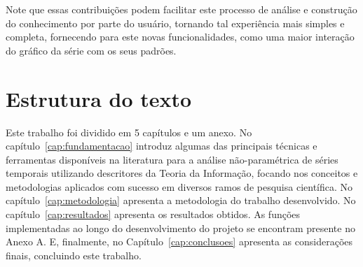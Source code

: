 Note que essas contribuições podem facilitar este processo de análise e construção do conhecimento por parte do usuário, tornando tal experiência mais simples e completa, fornecendo para este novas funcionalidades, como uma maior interação do gráfico da série com os seus padrões.

\section{Estrutura do texto}

Este trabalho foi dividido em 5 capítulos e um anexo. 
No capítulo~\ref{cap:fundamentacao} introduz algumas das principais técnicas e ferramentas disponíveis na literatura para a análise não-paramétrica de séries temporais utilizando descritores da Teoria da Informação, focando nos conceitos e metodologias aplicados com sucesso em diversos ramos de pesquisa científica.
No capítulo~\ref{cap:metodologia} apresenta a metodologia do trabalho desenvolvido.
No capítulo~\ref{cap:resultados} apresenta os resultados obtidos.
As funções implementadas ao longo do desenvolvimento do projeto se encontram presente no Anexo A.
E, finalmente, no Capítulo~\ref{cap:conclusoes} apresenta as considerações finais, concluindo este trabalho.

\newpage\lhead{\rightmark}
